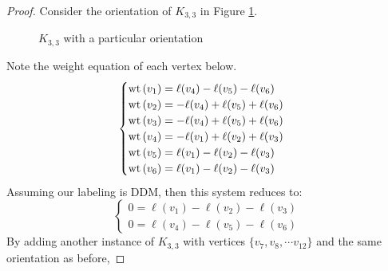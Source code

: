\begin{proof}
    Consider the orientation of \(K_{3,3}\) in Figure \ref{fig:oriented_K_3,3}.
    \begin{figure}[h!]
        \centering
        \caption{\(K_{3,3}\) with a particular orientation}
        \label{fig:oriented_K_3,3}
    \end{figure}
    Note the weight equation of each vertex below.
    \[
    \begin{cases}
        \mathrm{wt}\,(v_1) = \ell(v_4) - \ell(v_5) - \ell(v_6) \\
        \mathrm{wt}\,(v_2) = -\ell(v_4) + \ell(v_5) + \ell(v_6) \\
        \mathrm{wt}\,(v_3) = -\ell(v_4) + \ell(v_5) + \ell(v_6) \\
        \mathrm{wt}\,(v_4) = -\ell(v_1) + \ell(v_2) + \ell(v_3) \\
        \mathrm{wt}\,(v_5) = \ell(v_1) - \ell(v_2) - \ell(v_3) \\
        \mathrm{wt}\,(v_6) = \ell(v_1) - \ell(v_2) - \ell(v_3)
    \end{cases}
    \]
    Assuming our labeling is DDM, then this system reduces to:
    \[
    \begin{cases}
        0 = \ell(v_1) - \ell(v_2) - \ell(v_3) \\
        0 = \ell(v_4) - \ell(v_5) - \ell(v_6) 
    \end{cases}
    \]
    By adding another instance of \(K_{3,3}\) with vertices \(\{v_7, v_8, \cdots v_{12}\}\) and the same orientation as before,

\end{proof}
